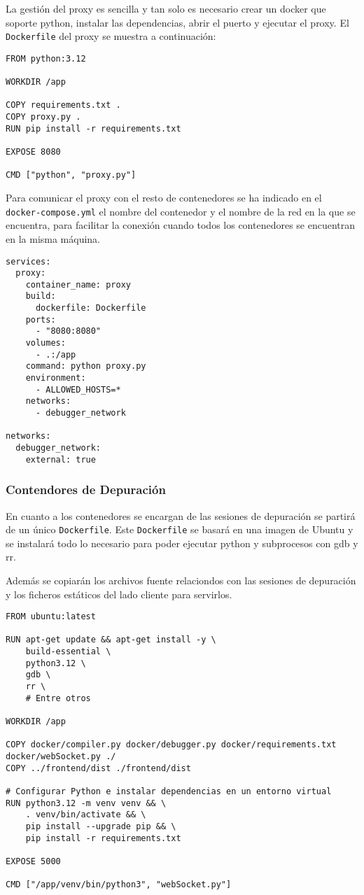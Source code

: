 La gestión del proxy es sencilla y tan solo es necesario crear un docker que soporte python, instalar las dependencias, abrir el puerto y ejecutar el proxy. El \texttt{Dockerfile} del proxy se muestra a continuación:

\begin{lstlisting}[caption={Dockerfile para el proxy}]
FROM python:3.12

WORKDIR /app

COPY requirements.txt .
COPY proxy.py .
RUN pip install -r requirements.txt

EXPOSE 8080

CMD ["python", "proxy.py"]
\end{lstlisting}

Para comunicar el proxy con el resto de contenedores se ha indicado en el \texttt{docker-compose.yml} el nombre del contenedor y el nombre de la red en la que se encuentra, para facilitar la conexión cuando todos los contenedores se encuentran en la misma máquina.

\begin{lstlisting}[caption={Docker-compose.yml para el contenedor del proxy}]
    services:
  proxy:
    container_name: proxy  
    build:
      dockerfile: Dockerfile
    ports:
      - "8080:8080" 
    volumes:
      - .:/app
    command: python proxy.py
    environment:
      - ALLOWED_HOSTS=*
    networks:
      - debugger_network

networks:
  debugger_network:
    external: true 
\end{lstlisting}

\subsubsection{Contendores de Depuración}

En cuanto a los contenedores se encargan de las sesiones de depuración se partirá de un único \texttt{Dockerfile}. Este \texttt{Dockerfile} se basará en una imagen de Ubuntu y se instalará todo lo necesario para poder ejecutar python y subprocesos con gdb y rr.

Además se copiarán los archivos fuente relaciondos con las sesiones de depuración y los ficheros estáticos del lado cliente para servirlos.

\begin{lstlisting}
FROM ubuntu:latest

RUN apt-get update && apt-get install -y \
    build-essential \
    python3.12 \
    gdb \
    rr \
    # Entre otros

WORKDIR /app

COPY docker/compiler.py docker/debugger.py docker/requirements.txt docker/webSocket.py ./
COPY ../frontend/dist ./frontend/dist

# Configurar Python e instalar dependencias en un entorno virtual
RUN python3.12 -m venv venv && \
    . venv/bin/activate && \
    pip install --upgrade pip && \
    pip install -r requirements.txt

EXPOSE 5000

CMD ["/app/venv/bin/python3", "webSocket.py"]
\end{lstlisting}



